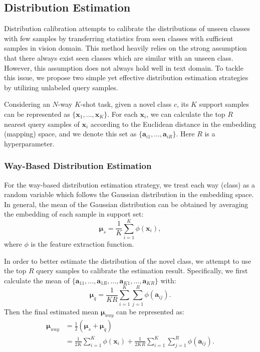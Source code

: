 \documentclass[letterpaper]{article} %
\begin{document}
\subsection{Distribution Estimation}
Distribution calibration \cite{freelunch} attempts to calibrate the distributions of unseen classes with few samples by transferring statistics from seen classes with sufficient samples in vision domain. This method heavily relies on the strong assumption that there always exist seen classes which are similar with an unseen class. However, this assumption does not always hold well in text domain. To tackle this issue, we propose two simple yet effective distribution estimation strategies by utilizing unlabeled query samples.

Considering an $N$-way $K$-shot task, given a novel class $c$, its $K$ support samples can be represented as $\{\bm{x}_1, ..., \bm{x}_K\}$. For each $\bm{x}_i$, we can calculate the top $R$ nearest query samples of $\bm{x}_i$ according to the Euclidean distance in the embedding (mapping) space, and we denote this set as $\{\bm{a}_{i1}, ..., \bm{a}_{iR}\}$. Here $R$ is a hyperparameter.

\subsubsection{Way-Based Distribution Estimation} For the way-based distribution estimation strategy, we treat each way (class) as a random variable which follows the Gaussian distribution in the embedding space. In general, the mean of the Gaussian distribution can be obtained by averaging the embedding of each sample in support set:
\begin{equation}
	\boldsymbol{\mu}_s = \frac{1}{K}\sum_{i=1}^{K} \phi(\bm x_i),
\end{equation}
where $\phi$ is the feature extraction function.

In order to better estimate the distribution of the novel class, we attempt to use the top $R$ query samples to calibrate the estimation result. Specifically, we first calculate the mean of $\{\bm{a}_{11},..., \bm{a}_{1R},..., \bm{a}_{K1}, ..., \bm{a}_{KR}\}$ with:
\begin{equation}
	\boldsymbol{\mu}_q = \frac{1}{{KR}}\sum_{i=1}^{K} \sum_{j=1}^{R}\phi(\bm{a}_{ij}).
\end{equation}
Then the final estimated mean $\bm{\mu}_{way}$ can be represented as:
\begin{equation}\label{way}
\begin{split}
	\bm{\mu}_{way} & =  \frac{1}{2}(\boldsymbol{\mu}_s+\boldsymbol{\mu}_q)\\
	 & = \frac{1}{2K}\sum_{i=1}^{K} \phi(\bm{x}_i) + \frac{1}{2KR} \sum_{i=1}^{K} \sum_{j=1}^{R} \phi(\bm{a}_{ij}).
\end{split}
\end{equation}
\end{document}
